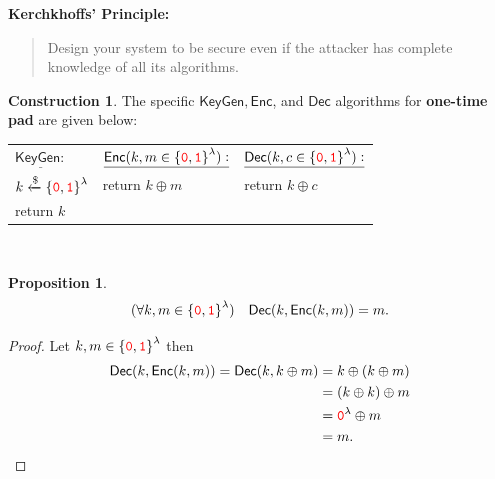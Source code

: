 \documentclass[12pt,openany]{book}
\newtheorem{proposition}[theorem]{Proposition}
\theoremstyle{definition}
\newtheorem{construction}{Construction}[chapter]
\newcommand{\KeyGen}{\mathsf{KeyGen}}
\newcommand{\Enc}{\mathsf{Enc}}
\newcommand{\Dec}{\mathsf{Dec}}
\newcommand{\zero}{\textcolor{red}{\texttt{0}}}
\newcommand{\one}{\textcolor{red}{\texttt{1}}}
\newcommand{\tab}{\hspace{12pt}}
\newcommand{\xor}{\oplus}
\newcommand{\randomness}{\$}
\newcommand{\uniform}{\xleftarrow{\randomness}}
\newcommand{\binaryfield}{\set{\zero,\one}}
\begin{document}
	\begin{tcolorbox}[colback=white,colframe=magenta,arc=5pt,title={\color{white}\bf }]
		\textbf{Kerchkhoffs' Principle:}
		\begin{quote}
			Design your system to be secure even if the attacker has complete knowledge of all its algorithms.
		\end{quote}
	\end{tcolorbox}
	\vspace{8pt}
	\begin{tcolorbox}[colback=white,colframe=defcolor,arc=5pt,title={\color{white}\bf One-time Pad (OTP)}]
		\begin{construction}
			The specific \(\KeyGen,\Enc\), and \(\Dec\) algorithms for \textbf{one-time pad} are given below: \begin{center}
				\begin{tabular}{|lll|}
					\hline
					$\underline{\KeyGen:}$ & \(\underline{\Enc(k,m\in\binaryfield^\lambda):}\) & \(\underline{\Dec(k,c\in\binaryfield^\lambda):}\)\\
					\tab$k\uniform\binaryfield^\lambda$ & \tab return \(k\xor m\) & \tab return \(k\xor c\)\\
					\tab return $k$ &&\\
					\hline
				\end{tabular}\\
			\end{center}
		\end{construction}
	\end{tcolorbox}
	\vspace{8pt}
	\begin{tcolorbox}[colback=white,colframe=procolor,arc=5pt,title={\color{white}\bf Corectness of OTP}]
		\begin{proposition}
			\[
			(\forall k,m\in\binaryfield^\lambda)\quad\Dec(k,\Enc(k,m))=m.
			\]
		\end{proposition}
	\end{tcolorbox}
	\begin{proof}
		Let \(k,m\in\binaryfield^\lambda\) then \begin{align*}
			\Dec(k,\Enc(k,m))=\Dec(k,k\xor m)&=k\xor(k\xor m)\\
			&=(k\xor k)\xor m\\
			&=\zero^\lambda\xor m\\
			&=m.
		\end{align*}
	\end{proof}
\end{document}
